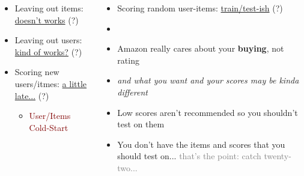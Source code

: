 \documentclass[xcolor={dvipsnames}]{beamer}
\begin{document}
{\begin{columns}
\begin{column}{.75\textwidth}

\vspace{-1em}
\begin{itemize}
\item<2-> Leaving out items: \underline{doesn't works} (?)
\item<3-> Leaving out users: \underline{kind of works?} (?)
\item<4-> Scoring new users/itmes: \underline{a little late...} (?)
\begin{itemize}
\item \textcolor{Maroon}{User/Items Cold-Start} 
\end{itemize}
\end{itemize}

\end{column}
\hspace*{-2em}
\begin{column}{.5\textwidth}

\begin{itemize}
\item<5-> Scoring random user-items: \underline{train/test-ish} (?)
\item[]
\item<6-> Amazon really cares about your \textbf{buying}, not rating
\item<7->[] \emph{and what you want and your scores may be kinda different} 
\item<8-> Low scores aren't recommended so you shouldn't test on them
\item<9-> You don't have the items and scores that you should test on... \textcolor{gray}{that's the point: catch twenty-two...}
\end{itemize}

\end{column}
\end{columns}

}

\end{document}
